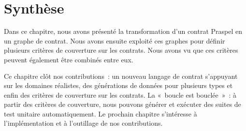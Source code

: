 \section{Synthèse}
\label{section:test:summary}

Dans ce chapitre, nous avons présenté la transformation d'un contrat Praspel en
un graphe de contrat. Nous avons ensuite exploité ces graphes pour définir
plusieurs critères de couverture sur les contrats. Nous avons vu que ces
critères peuvent également être combinés entre eux.

Ce chapitre clôt nos contributions~: un nouveau langage de contrat s'appuyant
sur les domaines réalistes, des générations de données pour plusieurs types et
enfin des critères de couverture sur les contrats. La «~boucle est bouclée~»~: à
partir des critères de couverture, nous pouvons générer et exécuter des suites
de test unitaire automatiquement. Le prochain chapitre s'intéresse à
l'implémentation et à l'outillage de nos contributions.
